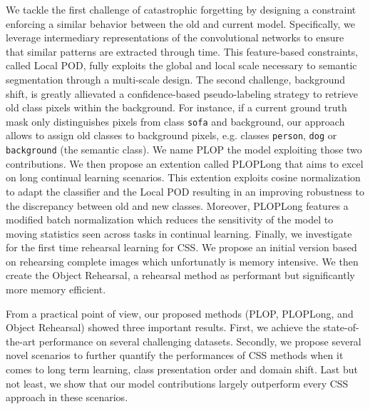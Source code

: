 We tackle the first challenge of catastrophic forgetting by designing a constraint enforcing a
similar behavior between the old and current model. Specifically, we leverage intermediary
representations of the convolutional networks to ensure that similar patterns are extracted through
time. This feature-based constraints, called Local POD, fully exploits the global and local scale
necessary to semantic segmentation through a multi-scale design. The second challenge, background
shift, is greatly allievated a confidence-based pseudo-labeling strategy to retrieve old class
pixels within the background. For instance, if a current ground truth mask only distinguishes pixels
from class \texttt{sofa} and background, our approach allows to assign old classes to background
pixels, e.g. classes \texttt{person}, \texttt{dog} or \texttt{background} (the semantic class). We
name PLOP the model exploiting those two contributions. We then propose an extention called PLOPLong
that aims to excel on long continual learning scenarios. This extention exploits cosine
normalization to adapt the classifier and the Local POD resulting in an improving robustness to the
discrepancy between old and new classes. Moreover, PLOPLong features a modified batch normalization
which reduces the sensitivity of the model to moving statistics seen across tasks in continual
learning. Finally, we investigate for the first time rehearsal learning for CSS. We propose an
initial version based on rehearsing complete images which unfortunatly is memory intensive. We then
create the Object Rehearsal, a rehearsal method as performant but significantly more memory
efficient.


From a practical point of view, our proposed methods (PLOP, PLOPLong, and Object Rehearsal) showed
three important results. First, we achieve the state-of-the-art performance on several challenging
datasets. Secondly, we propose several novel scenarios to further quantify the performances of CSS
methods when it comes to long term learning, class presentation order and domain shift. Last but not
least, we show that our model contributions largely outperform every CSS approach in these
scenarios.

